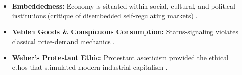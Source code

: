 \begin{QuickRevision}
\begin{itemize}
    \item \textbf{Embeddedness:} Economy is situated within social, cultural, and political institutions (critique of disembedded self-regulating markets) .
    \item \textbf{Veblen Goods \& Conspicuous Consumption:} Status-signaling violates classical price-demand mechanics .
    \item \textbf{Weber's Protestant Ethic:} Protestant asceticism provided the ethical ethos that stimulated modern industrial capitalism .
\end{itemize}
\end{QuickRevision}